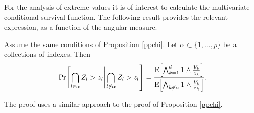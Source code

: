 For the analysis of extreme values it is of interest to calculate the multivariate conditional survival function. The following result provides the relevant expression, as a function of the angular measure.
\begin{prop}
Assume the same conditions of Proposition \ref{ppchi}. 
Let $\alpha \subset \{1, \ldots ,p\}$ be a collections of indexes. 
Then     
\begin{equation} \label{eqn:condsurv2df}
    \text{Pr}\left[\bigcap_{l \in \alpha} Z_l > z_l \right|\left. \bigcap_{l\not\in\alpha} Z_l > z_l\right] =
      \frac{\expect{\bigwedge_{k = 1}^d 1\wedge \frac{V_k}{z_k}}}{\expect{\bigwedge_{k \not\in\alpha}1\wedge\frac{V_k}{z_k}}}.
  \end{equation}
\end{prop}  
The proof uses a similar approach to the proof of Proposition \ref{ppchi}.





